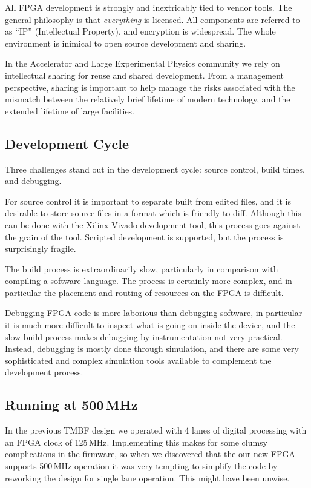 \documentclass[
    a4paper,
    keeplastbox,            %
    hyphens,                %
]{jacow}
\begin{document}
All FPGA development is strongly and inextricably tied to vendor tools.  The
general philosophy is that \emph{everything} is licensed.  All components
are referred to as ``IP'' (Intellectual Property), and encryption is widespread.
The whole environment is inimical to open source development and sharing.

In the Accelerator and Large Experimental Physics community we rely on
intellectual sharing for reuse and shared development.  From a management
perspective, sharing is important to help manage the risks associated with the
mismatch between the relatively brief lifetime of modern technology, and the
extended lifetime of large facilities.


\subsection{Development Cycle}

Three challenges stand out in the development cycle: source control, build
times, and debugging.

For source control it is important to separate built from edited files, and it
is desirable to store source files in a format which is friendly to diff.
Although this can be done with the Xilinx Vivado development tool, this process
goes against the grain of the tool.  Scripted development is supported, but the
process is surprisingly fragile.

The build process is extraordinarily slow, particularly in comparison with
compiling a software language.  The process is certainly more complex, and in
particular the placement and routing of resources on the FPGA is difficult.

Debugging FPGA code is more laborious than debugging software, in particular it
is much more difficult to inspect what is going on inside the device, and the
slow build process makes debugging by instrumentation not very practical.
Instead, debugging is mostly done through simulation, and there are some very
sophisticated and complex simulation tools available to complement the
development process.


\subsection{Running at 500\,MHz}

In the previous TMBF design we operated with 4 lanes of digital processing with
an FPGA clock of 125\,MHz.  Implementing this makes for some clumsy
complications in the firmware, so when we discovered that the our new FPGA
supports 500\,MHz operation it was very tempting to simplify the code by
reworking the design for single lane operation.  This might have been unwise.
\end{document}
